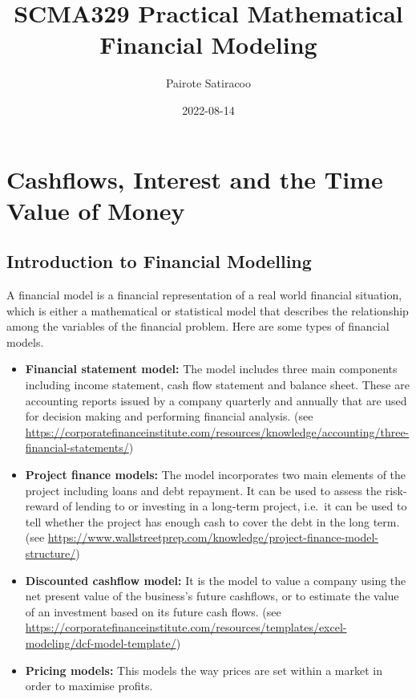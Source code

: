 \documentclass[landscape, 20pt]{extreport}
\title{SCMA329 Practical Mathematical Financial Modeling}
\author{Pairote Satiracoo}
\date{2022-08-14}
\theoremstyle{definition}
\theoremstyle{definition}
\theoremstyle{definition}
\theoremstyle{definition}
\theoremstyle{remark}
\begin{document}
\maketitle

{
\setcounter{tocdepth}{1}
}
\hypertarget{cashflows-interest-and-the-time-value-of-money}{%
\chapter{Cashflows, Interest and the Time Value of Money}\label{cashflows-interest-and-the-time-value-of-money}}

\hypertarget{introduction-to-financial-modelling}{%
\newpage \section{Introduction to Financial Modelling}\label{introduction-to-financial-modelling}}

A financial model is a financial representation of a real world
financial situation, which is either a mathematical or statistical model
that describes the relationship among the variables of the financial
problem. Here are some types of financial models.

\begin{itemize}
\item
  \textbf{Financial statement model:} The model includes three main
  components including income statement, cash flow statement and
  balance sheet. These are accounting reports issued by a company
  quarterly and annually that are used for decision making and
  performing financial analysis. (see
  \url{https://corporatefinanceinstitute.com/resources/knowledge/accounting/three-financial-statements/})
\item
  \textbf{Project finance models:} The model incorporates two main elements
  of the project including loans and debt repayment. It can be used to
  assess the risk-reward of lending to or investing in a long-term
  project, i.e.~it can be used to tell whether the project has enough
  cash to cover the debt in the long term. (see
  \url{https://www.wallstreetprep.com/knowledge/project-finance-model-structure/})
\item
  \textbf{Discounted cashflow model:} It is the model to value a company
  using the net present value of the business's future cashflows, or
  to estimate the value of an investment based on its future cash
  flows. (see
  \url{https://corporatefinanceinstitute.com/resources/templates/excel-modeling/dcf-model-template/})
\item
  \textbf{Pricing models:} This models the way prices are set within a
  market in order to maximise profits.
\end{itemize}
\end{document}
